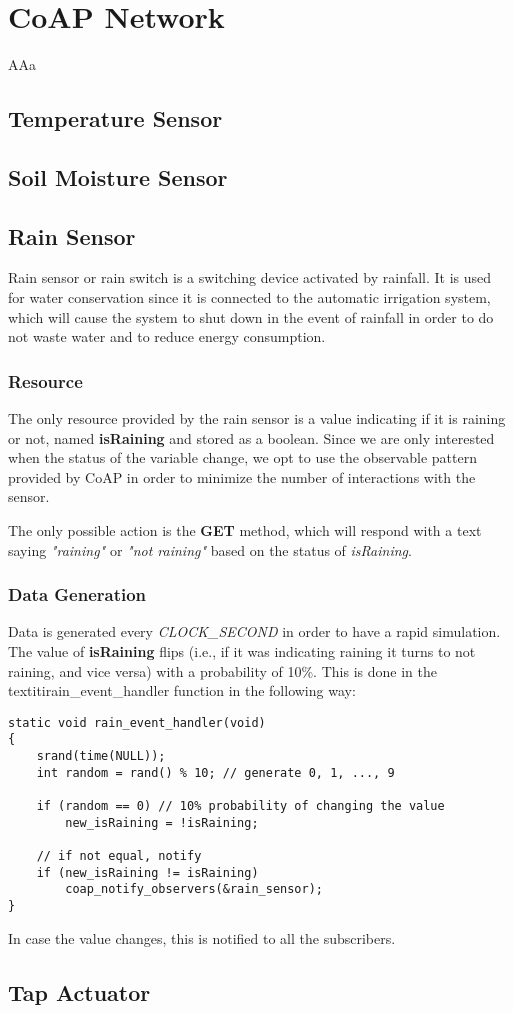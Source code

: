 \section{CoAP Network}
AAa

\subsection{Temperature Sensor}

\subsection{Soil Moisture Sensor}

\subsection{Rain Sensor}
Rain sensor or rain switch is a switching device activated by rainfall. It is used for water conservation since it is connected to the automatic irrigation system, which will cause the system to shut down in the event of rainfall in order to do not waste water and to reduce energy consumption.

\subsubsection{Resource}
The only resource provided by the rain sensor is a value indicating if it is raining or not, named \textbf{isRaining} and stored as a boolean. Since we are only interested when the status of the variable change, we opt to use the observable pattern provided by CoAP in order to minimize the number of interactions with the sensor.

The only possible action is the \textbf{GET} method, which will respond with a text saying \textit{"raining"} or \textit{"not raining"} based on the status of \textit{isRaining}.

\subsubsection{Data Generation}
Data is generated every \textit{CLOCK\_SECOND} in order to have a rapid simulation. The value of \textbf{isRaining} flips (i.e., if it was indicating raining it turns to not raining, and vice versa) with a probability of 10\%. This is done in the textiti{rain\_event\_handler} function in the following way:

\begin{lstlisting}
static void rain_event_handler(void)
{
    srand(time(NULL));
    int random = rand() % 10; // generate 0, 1, ..., 9
    
    if (random == 0) // 10% probability of changing the value
        new_isRaining = !isRaining;

    // if not equal, notify
    if (new_isRaining != isRaining)
        coap_notify_observers(&rain_sensor);
}
\end{lstlisting}

In case the value changes, this is notified to all the subscribers.

\subsection{Tap Actuator}
